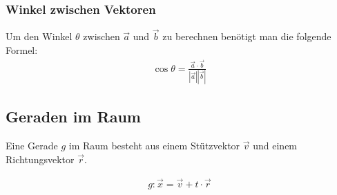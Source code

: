 \subsubsection{Winkel zwischen Vektoren}
\begin{flushleft}
Um den Winkel $\theta$ zwischen $\vec{a}$ und $\vec{b}$ zu berechnen benötigt man die folgende Formel:
\begin{align}
    \cos\theta = \frac{\vec{a}\cdot\vec{b}}{|\vec{a}||\vec{b}|}
\end{align}

\end{flushleft}

\subsection{Geraden im Raum}
\begin{flushleft}
Eine Gerade $g$ im Raum besteht aus einem Stützvektor $\vec{v}$ und einem Richtungsvektor $\vec{r}$.

\begin{align}
    g\colon\vec{x}=\vec{v}+t\cdot\vec{r}
\end{align}
\end{flushleft}


